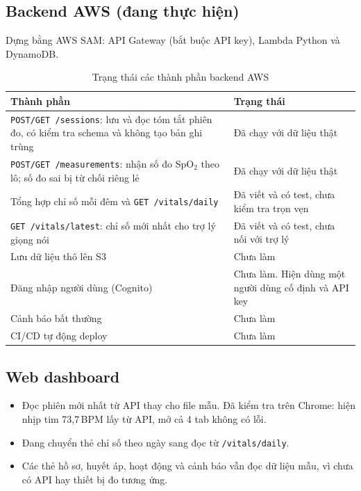 \documentclass[12pt,a4paper]{article}
\newcommand{\spo}{SpO$_2$}
\newcommand{\code}[1]{\texttt{#1}}
\begin{document}
\subsection{Backend AWS (đang thực hiện)}
\label{sec:aws}

Dựng bằng AWS SAM: API Gateway (bắt buộc API key), Lambda Python và DynamoDB.

\begin{table}[h]
  \centering
  \caption{Trạng thái các thành phần backend AWS}
  \begin{tabularx}{\textwidth}{@{}Lp{4.6cm}@{}}
    \toprule
    Thành phần & Trạng thái \\
    \midrule
    \code{POST/GET /sessions}: lưu và đọc tóm tắt phiên đo, có kiểm tra schema và không tạo bản ghi trùng & Đã chạy với dữ liệu thật \\
    \code{POST/GET /measurements}: nhận số đo \spo{} theo lô; số đo sai bị từ chối riêng lẻ & Đã chạy với dữ liệu thật \\
    Tổng hợp chỉ số mỗi đêm và \code{GET /vitals/daily} & Đã viết và có test, chưa kiểm tra trọn vẹn \\
    \code{GET /vitals/latest}: chỉ số mới nhất cho trợ lý giọng nói & Đã viết và có test, chưa nối với trợ lý \\
    Lưu dữ liệu thô lên S3 & Chưa làm \\
    Đăng nhập người dùng (Cognito) & Chưa làm. Hiện dùng một người dùng cố định và API key \\
    Cảnh báo bất thường & Chưa làm \\
    CI/CD tự động deploy & Chưa làm \\
    \bottomrule
  \end{tabularx}
\end{table}

\subsection{Web dashboard}

\begin{itemize}
  \item Đọc phiên mới nhất từ API thay cho file mẫu. Đã kiểm tra trên Chrome: hiện nhịp tim 73,7\,BPM lấy từ API, mở cả 4 tab không có lỗi.
  \item Đang chuyển thẻ chỉ số theo ngày sang đọc từ \code{/vitals/daily}.
  \item Các thẻ hồ sơ, huyết áp, hoạt động và cảnh báo vẫn đọc dữ liệu mẫu, vì chưa có API hay thiết bị đo tương ứng.
\end{itemize}
\end{document}
